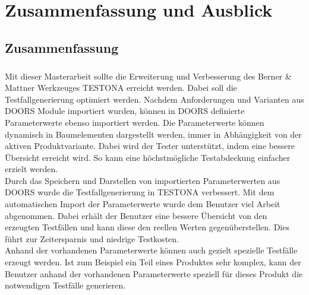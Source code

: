 \chapter{Zusammenfassung und Ausblick}\label{chp:zusammenfassung}



\newpage
\section{Zusammenfassung}
\paragraph{}
Mit dieser Masterarbeit sollte die Erweiterung und Verbesserung des Berner \& Mattner Werkzeuges TESTONA erreicht werden. Dabei soll die Testfallgenerierung optimiert werden. Nachdem Anforderungen und Varianten aus DOORS Module importiert wurden, können in DOORS definierte Parameterwerte ebenso importiert werden. Die Parameterwerte können dynamisch in Baumelementen dargestellt werden, immer in Abhängigkeit von der aktiven Produktvariante. Dabei wird der Tester unterstützt, indem eine bessere Übersicht erreicht wird. So kann eine höchstmögliche Testabdeckung einfacher erzielt werden.\\


Durch das Speichern und Darstellen von importierten Parameterwerten aus DOORS wurde die Testfallgenerierung in TESTONA verbessert. Mit dem automatischen Import der Parameterwerte wurde dem Benutzer viel Arbeit abgenommen. Dabei erhält der Benutzer eine bessere Übersicht von den erzeugten Testfällen und kann diese den reellen Werten gegenüberstellen. Dies führt zur Zeitersparnis und niedrige Testkosten.\\


Anhand der vorhandenen Parameterwerte können auch gezielt spezielle Testfälle erzeugt werden. Ist zum Beispiel ein Teil eines Produktes sehr komplex, kann der Benutzer anhand der vorhandenen Parameterwerte speziell für dieses Produkt die notwendigen Testfälle generieren.\\


